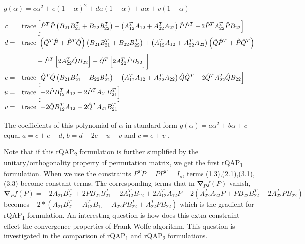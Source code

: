 \documentclass[12pt,oneside,final]{thesis}
\begin{document}
$g\left(\alpha\right)=c\alpha^{2}+e(1-\alpha)^{2}+d\alpha(1-\alpha)+u\alpha+v(1-\alpha)$


\begin{align*}
c & = &\textup{trace}&\left[\hat{P}^{T}\hat{P}\left(B_{21}B_{21}^{T}+B_{22}B_{22}^{T}\right)+\left(A_{12}^{T}A_{12}+A_{22}^{T}A_{22}\right)\hat{P}\hat{P}^{T}-2\hat{P}^{T}A_{22}^{T}\hat{P}B_{22}\right]
\\
d & = & \textup{trace}& \biggl[\left(\hat{Q}^{T}\hat{P}+\hat{P}^{T}\hat{Q}\right)\left(B_{21}B_{21}^{T}+B_{22}B_{22}^{T}\right)+\left(A_{12}^{T}A_{12}+A_{22}^{T}A_{22}\right)\left(\hat{Q}\hat{P}^{T}+\hat{P}\hat{Q}^{T}\right) \\
 &  &  & -\hat{P}^{T}\left[2 A_{22}^{T}\hat{Q}B_{22}\right]-\hat{Q}^{T}\left[ 2 A_{22}^{T}\hat{P}B_{22}\right]\biggr] \\
e & =& \textup{trace} & \left[\hat{Q}^{T}\hat{Q}\left(B_{21}B_{21}^{T}+B_{22}B_{22}^{T}\right)+\left(A_{12}^{T}A_{12}+A_{22}^{T}A_{22}\right)\hat{Q}\hat{Q}^{T}-2\hat{Q}^{T}A_{22}^{T}\hat{Q}B_{22}\right]
\\ u & = & \textup{trace} &\left[-2\hat{P}B_{12}^{T}A_{12}-2\hat{P}^{T}A_{21}B_{21}^{T}\right]
\\ v & = & \textup{trace} &\left[-2\hat{Q}B_{12}^{T}A_{12}-2\hat{Q}^{T}A_{21}B_{21}^{T}\right]
\end{align*}

The coefficients of this  polynomial of $\alpha$ in standard form $g(\alpha)= a{\alpha}^2+b\alpha+c$ equal $a=c+e-d$,
$b=d-2e+u-v$ and $c=e+v$ .

Note that if this rQAP\textsubscript{2} formulation is further simplified  by the unitary/orthogonality property of permutation  matrix, we get the first rQAP\textsubscript{1} formulation. When we use the constraints $P^TP=PP^T=I_{s}$, terms (1.3),(2.1),(3.1),(3.3) become constant terms. The corresponding  terms that in $\boldsymbol{\nabla}_{P}f(P)$ vanish,
$\boldsymbol{\nabla}_{P}f(P)=-2A_{21}B_{21}^{T}+2PB_{21}B_{21}^{T}-2A_{12}^{T}B_{12}+2A_{12}^{T}A_{12}P+2(A_{22}^{T}A_{22}P+PB_{22}B_{22}^{T}-2A_{22}^{T}PB_{22})$
becomes $-2*(A_{21}B_{21}^T+A_{12}^TB_{12}+A_{22}PB_{22}^T+A_{22}^TPB_{22})$ which is the gradient for rQAP\textsubscript{1} formulation.
An interesting question is how does this extra constraint effect the convergence properties of Frank-Wolfe algorithm.  This question is investigated in the comparison of rQAP\textsubscript{1} and rQAP\textsubscript{2} formulations.  
\end{document}
